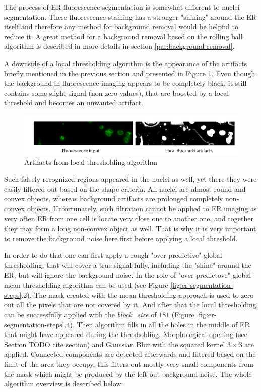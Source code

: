The process of ER fluorescence segmentation is somewhat different to nuclei segmentation. These fluorescence staining has a stronger "shining" around the ER itself and therefore any method for background removal would be helpful to reduce it. A great method for a background removal based on the rolling ball algorithm is described in more details in section \ref{par:background-removal}.

A downside of a local thresholding algorithm is the appearance of the artifacts briefly mentioned in the previous section and presented in Figure \ref{fig:artifacts-er}. Even though the background in fluorescence imaging appears to be completely black, it still contains some slight signal (non-zero values), that are boosted by a local threshold and becomes an unwanted artifact. 
\begin{figure}[H]
	\begin{center}
		\includegraphics[width=\linewidth]{bilder/ER/artifacts.png}
		\caption{Artifacts from local thresholding algorithm}\label{fig:artifacts-er}
	\end{center}
\end{figure}
Such falsely recognized regions appeared in the nuclei as well, yet there they were easily filtered out based on the shape criteria. All nuclei are almost round and convex objects, whereas background artifacts are prolonged completely non-convex objects. Unfortunately, such filtration cannot be applied to ER imaging as very often ER from one cell is locate very close one to another one, and together they may form a long non-convex object as well. That is why it is very important to remove the background noise here first before applying a local threshold.

In order to do that one can first apply a rough "over-predictive" global thresholding, that will cover a true signal fully, including the "shine" around the ER, but will ignore the background noise. In the role of "over-predictove" global mean thresholding algorithm can be used (see Figure \ref{fig:er-segmentation-steps}.2). The mask created with the mean thresholding approach is used to zero out all the pixels that are not covered by it. And after that the local thresholding can be successfully applied with the \textit{block\_size} of $181$ (Figure \ref{fig:er-segmentation-steps}.4). Then  algorithm fills in all the holes in the middle of ER that might have appeared during the thresholding. Morphological opening (see Section TODO cite section) and Gaussian Blur with the squared kernel $3 \times 3$ are applied. Connected components are detected afterwards and filtered based on the limit of the area they occupy, this filters out mostly very small components from the mask which might be produced by the left out background noise. The whole algorithm overview is described below:

